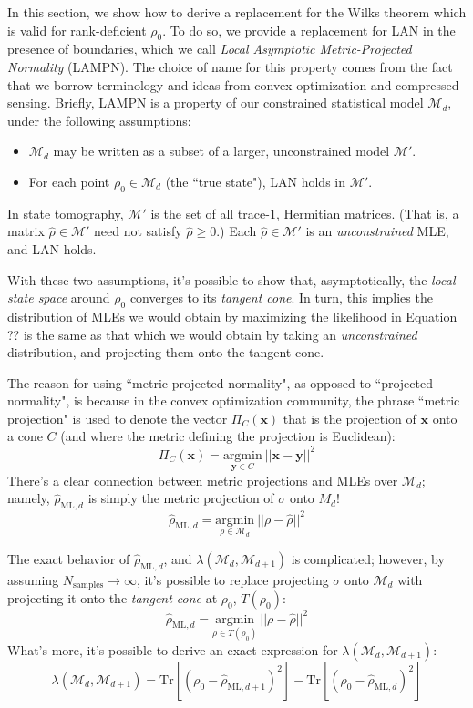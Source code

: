 \documentclass[aps,pra, twocolumn]{revtex4-1}
\newcommand{\bs}[1]{\boldsymbol{#1}}
\newcommand{\M}{\mathcal{M}}
\newcommand{\rhohat}{\hat{\rho}}
\newcommand{\rhoML}[1]{\rhohat_{\scriptscriptstyle{\mathrm{ML},#1}}}
\begin{document}
In this section, we show how to derive a replacement for the Wilks theorem which is valid for rank-deficient $\rho_{0}$. To do so, we provide a replacement for LAN in the presence of boundaries, which we call \emph{Local Asymptotic Metric-Projected Normality} (LAMPN). The choice of name for this property comes from the fact that we borrow terminology and ideas from convex optimization and compressed sensing. Briefly, LAMPN is a property of our constrained statistical model $\M_{d}$, under the following assumptions:

\begin{itemize}
\item $\M_{d}$ may be written as a subset of a larger, unconstrained model $\M'$.
\item For each point $\rho_{0} \in \M_{d}$ (the ``true state"), LAN holds in $\M'$.
\end{itemize}

In state tomography, $\M'$ is the set of all trace-1, Hermitian matrices. (That is, a matrix $\hat{\rho} \in \M'$ need not satisfy $\hat{\rho} \geq 0$.) Each $\hat{\rho} \in \M'$ is an \emph{unconstrained} MLE, and LAN holds.

With these two assumptions, it's possible to show that, asymptotically, the \emph{local state space} around $\rho_{0}$ converges to its \emph{tangent cone}. In turn, this implies the distribution of MLEs we would obtain by maximizing the likelihood in Equation ?? is the same as that which we would obtain by taking an \emph{unconstrained} distribution, and projecting them onto the tangent cone.

The reason for using ``metric-projected normality", as opposed to ``projected normality", is because in the convex optimization community, the phrase ``metric projection" is used to denote the vector $\Pi_{C}(\bs{x})$ that is the projection of $\bs{x}$ onto a cone $C$ (and where the metric defining the projection is Euclidean):
\[\Pi_{C}(\bs{x}) = \underset{\bs{y}\in C}{\text{argmin}}~||\bs{x}  -\bs{y}||^{2}\]
There's a clear connection between metric projections and MLEs over $\M_{d}$; namely, $\rhoML{d}$ is simply the metric projection of $\sigma$ onto $M_{d}$!
\[\rhoML{d} = \underset{\rho \in \M_{d}}{\text{argmin}}~||\rho  -\hat{\rho}||^{2}\]

The exact behavior of $\rhoML{d}$, and $\lambda(\M_{d}, \M_{d+1})$ is complicated; however, by assuming $N_{\mathrm{samples}} \rightarrow \infty$, it's possible to replace projecting $\sigma$ onto $\M_{d}$ with projecting it onto the \emph{tangent cone} at $\rho_{0}$, $T(\rho_{0})$:
\[\rhoML{d} = \underset{\rho \in T(\rho_{0})}{\text{argmin}}~||\rho  -\hat{\rho}||^{2}\]
What's more, it's possible to derive an exact expression for $\lambda(\M_{d}, \M_{d+1})$:
\[\lambda(\M_{d}, \M_{d+1}) = \mathrm{Tr}[(\rho_{0} - \rhoML{d+1})^{2}] -  \mathrm{Tr}[(\rho_{0} - \rhoML{d})^{2}] \]
\end{document}
